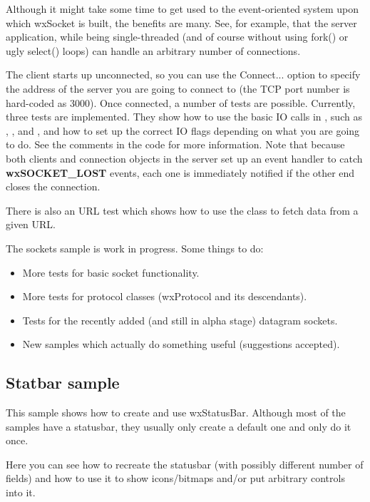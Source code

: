 Although it might take some time to get used to the event-oriented
system upon which wxSocket is built, the benefits are many. See, for
example, that the server application, while being single-threaded
(and of course without using fork() or ugly select() loops) can handle
an arbitrary number of connections.

The client starts up unconnected, so you can use the Connect... option
to specify the address of the server you are going to connect to (the
TCP port number is hard-coded as 3000). Once connected, a number of
tests are possible. Currently, three tests are implemented. They show
how to use the basic IO calls in ,
such as , , 
 and ,
and how to set up the correct IO flags depending on what you are going to
do. See the comments in the code for more information. Note that because
both clients and connection objects in the server set up an event handler
to catch {\bf wxSOCKET\_LOST} events, each one is immediately notified
if the other end closes the connection.

There is also an URL test which shows how to use
the  class to fetch data from a given URL.

The sockets sample is work in progress. Some things to do:

\begin{itemize}\itemsep=0pt
\item More tests for basic socket functionality.
\item More tests for protocol classes (wxProtocol and its descendants).
\item Tests for the recently added (and still in alpha stage) datagram sockets.
\item New samples which actually do something useful (suggestions accepted).
\end{itemize}

\subsection{Statbar sample}\label{samplestatbar}

This sample shows how to create and use wxStatusBar. Although most of the
samples have a statusbar, they usually only create a default one and only
do it once.

Here you can see how to recreate the statusbar (with possibly different number
of fields) and how to use it to show icons/bitmaps and/or put arbitrary
controls into it.

